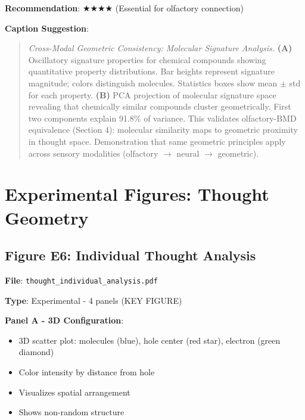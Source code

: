 \documentclass[11pt]{article}
\begin{document}
\textbf{Recommendation}: $\bigstar\bigstar\bigstar\bigstar$ (Essential for olfactory connection)

\textbf{Caption Suggestion}:
\begin{quote}
\textit{Cross-Modal Geometric Consistency: Molecular Signature Analysis.} \textbf{(A)} Oscillatory signature properties for chemical compounds showing quantitative property distributions. Bar heights represent signature magnitude; colors distinguish molecules. Statistics boxes show mean $\pm$ std for each property. \textbf{(B)} PCA projection of molecular signature space revealing that chemically similar compounds cluster geometrically. First two components explain 91.8\% of variance. This validates olfactory-BMD equivalence (Section 4): molecular similarity maps to geometric proximity in thought space. Demonstration that same geometric principles apply across sensory modalities (olfactory $\to$ neural $\to$ geometric).
\end{quote}

\newpage

\section{Experimental Figures: Thought Geometry}

\subsection{Figure E6: Individual Thought Analysis}


\textbf{File}: \texttt{thought\_individual\_analysis.pdf}

\textbf{Type}: Experimental - 4 panels (KEY FIGURE)

\textbf{Panel A - 3D Configuration}:
\begin{itemize}
\item 3D scatter plot:  molecules (blue), hole center (red star), electron (green diamond)
\item Color intensity by distance from hole
\item Visualizes spatial arrangement
\item Shows non-random structure
\end{itemize}
\end{document}
